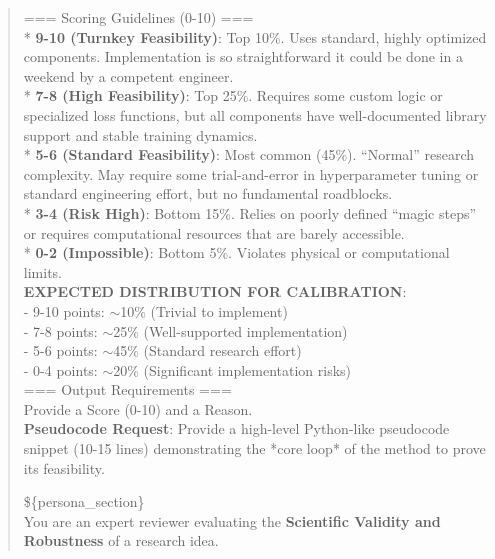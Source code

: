 \begin{quote}
\begin{tcolorbox}[breakable,colback=eval!20!white, colframe=eval!60!black, title=\textbf{Prompt for Evaluation Agent - Feasibility}]
        === Scoring Guidelines (0-10) ===\\
        * \textbf{9-10 (Turnkey Feasibility)}: Top 10\%. Uses standard, highly optimized components. Implementation is so straightforward it could be done in a weekend by a competent engineer.\\
        * \textbf{7-8 (High Feasibility)}: Top 25\%. Requires some custom logic or specialized loss functions, but all components have well-documented library support and stable training dynamics.\\
        * \textbf{5-6 (Standard Feasibility)}: Most common (45\%). ``Normal'' research complexity. May require some trial-and-error in hyperparameter tuning or standard engineering effort, but no fundamental roadblocks.\\
        * \textbf{3-4 (Risk High)}: Bottom 15\%. Relies on poorly defined ``magic steps'' or requires computational resources that are barely accessible.\\
        * \textbf{0-2 (Impossible)}: Bottom 5\%. Violates physical or computational limits.\\

        \textbf{EXPECTED DISTRIBUTION FOR CALIBRATION}:\\
        - 9-10 points: $\sim$10\% (Trivial to implement)\\
        - 7-8 points: $\sim$25\% (Well-supported implementation)\\
        - 5-6 points: $\sim$45\% (Standard research effort)\\
        - 0-4 points: $\sim$20\% (Significant implementation risks)\\

        === Output Requirements ===\\
        Provide a Score (0-10) and a Reason.\\
        \textbf{Pseudocode Request}: Provide a high-level Python-like pseudocode snippet (10-15 lines) demonstrating the *core loop* of the method to prove its feasibility.
    \end{tcolorbox}

    \begin{tcolorbox}[breakable,colback=eval!20!white, colframe=eval!60!black, title=\textbf{Prompt for Evaluation Agent - Validity}]
    \label{app:prompt_eval_validity}
        \$\{persona\_section\}\\
        You are an expert reviewer evaluating the \textbf{Scientific Validity and Robustness} of a research idea.\\


\end{tcolorbox}
\end{quote}
